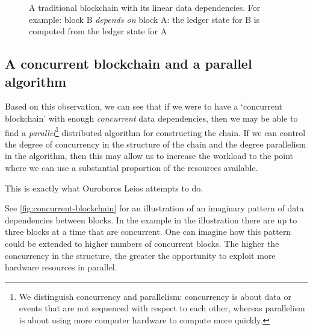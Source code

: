 \documentclass[11pt,a4paper]{article}
\begin{document}
\begin{figure}
\begin{center}
\end{center}
\caption{A traditional blockchain with its linear data dependencies. For
example: block B \emph{depends on} block A: the ledger state for B is computed
from the ledger state for A}
\label{fig:linear-blockchain}
\end{figure}

\subsection{A concurrent blockchain and a parallel algorithm}

Based on this observation, we can see that if we were to have a `concurrent
blockchain' with enough \emph{concurrent} data dependencies, then we may be
able to find a \emph{parallel}\footnote{We distinguish concurrency and
parallelism: concurrency is about data or events that are not sequenced with
respect to each other, whereas parallelism is about using more computer hardware
to compute more quickly.}
distributed algorithm for constructing the chain. If we can control the degree
of concurrency in the structure of the chain and the degree parallelism in the
algorithm, then this may allow us to increase the workload to the point where
we can use a substantial proportion of the resources available.

This is exactly what Ouroboros Leios attempts to do.

See \cref{fig:concurrent-blockchain} for an illustration of an imaginary pattern
of data dependencies between blocks. In the example in the illustration there
are up to three blocks at a time that are concurrent. One can imagine how this
pattern could be extended to higher numbers of concurrent blocks. The higher
the concurrency in the structure, the greater the opportunity to exploit more
hardware resources in parallel.
\end{document}
